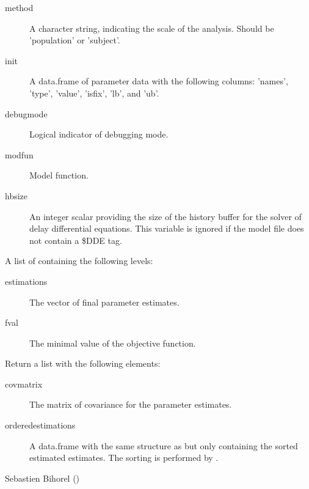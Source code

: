 \begin{Arguments}
\begin{ldescription}
\begin{description}
\item[method] A character string, indicating the scale of the analysis. Should
be 'population' or 'subject'.
\item[init] A data.frame of parameter data with the following columns:
'names', 'type', 'value', 'isfix', 'lb', and 'ub'.
\item[debugmode] Logical indicator of debugging mode.
\item[modfun] Model function.
\item[hbsize] An integer scalar providing the size of the history buffer for
the solver of delay differential equations. This variable is ignored if
the model file does not contain a \$DDE tag.

\end{description}


\item[\code{Fit}] A list of containing the following levels:\begin{description}

\item[estimations] The vector of final parameter estimates.
\item[fval] The minimal value of the objective function.

\end{description}


\end{ldescription}
\end{Arguments}
%
\begin{Value}
Return a list with the following elements: \begin{description}

\item[covmatrix] The matrix of covariance for the parameter estimates.
\item[orderedestimations] A data.frame with the same structure as
 but only containing the sorted estimated estimates.
The sorting is performed by .

\end{description}

\end{Value}
%
\begin{Author}\relax
Sebastien Bihorel ()
\end{Author}
%
\begin{SeeAlso}\relax
{}
\end{SeeAlso}
